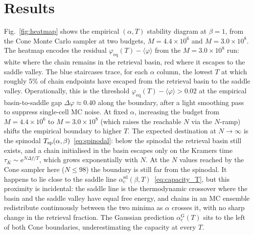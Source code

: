 \documentclass[letterpaper]{article} %
\newcommand{\e}{{\mathrm{e}}}
\newcommand{\Bnet}{\beta}
\newcommand{\acGauss}{\alpha_c^{\mathrm{G}}}
\newcommand{\acSd}{\alpha_c^{\mathrm{sd}}}
\begin{document}

\section{Results}
\label{sec:results}

Fig.~\ref{fig:heatmap} shows the empirical $(\alpha, T)$ stability diagram at
$\Bnet = 1$, from the Cone Monte Carlo sampler at two budgets,
$M = 4.4 \times 10^6$ and $M = 3.0 \times 10^8$. The heatmap encodes the
residual $\varphi_{\mathrm{eq}}(T) - \langle\varphi\rangle$ from the
$M = 3.0 \times 10^8$ run: white where the chain remains in the retrieval
basin, red where it escapes to the saddle valley. The blue staircases trace,
for each $\alpha$ column, the lowest $T$ at which roughly 5\% of chain
endpoints have escaped from the retrieval basin to the saddle valley.
Operationally, this is the threshold
$\varphi_{\mathrm{eq}}(T) - \langle\varphi\rangle > 0.02$ at the empirical
basin-to-saddle gap $\Delta\varphi \approx 0.40$ along the boundary, after
a light smoothing pass to suppress single-cell MC noise. At fixed $\alpha$, increasing the budget from $M = 4.4 \times 10^6$ to
$M = 3.0 \times 10^8$ (which raises the reachable $N$ via the $N$-ramp)
shifts the empirical boundary to higher $T$. The expected destination at
$N \to \infty$ is the spinodal $T_{\rm sp}(\alpha, \Bnet)$~\eqref{eq:spinodal}:
below the spinodal the retrieval basin still exists, and a chain initialised
in the basin escapes only on the Kramers time
$\tau_K \sim \e^{N \Delta f / T}$, which grows exponentially with $N$.  At
the $N$ values reached by the Cone sampler here ($N \le 98$) the boundary
is still far from the spinodal.  It happens to lie close to the saddle
line $\acSd(\Bnet, T)$~\eqref{eq:capacity_T}, but this proximity is
incidental: the saddle line is the thermodynamic crossover where the basin
and the saddle valley have equal free energy, and chains in an MC ensemble
redistribute continuously between the two minima as $\alpha$ crosses it,
with no sharp change in the retrieval fraction.  The Gaussian prediction
$\acGauss(T)$ sits to the left of both Cone boundaries, underestimating
the capacity at every $T$.
\end{document}
